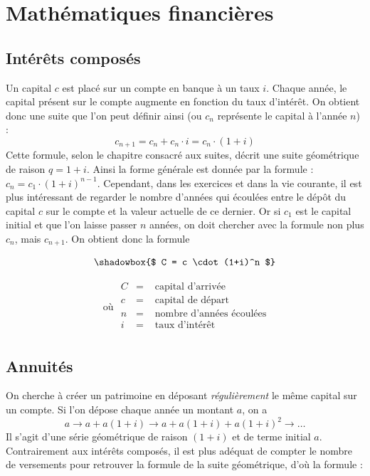 \chapter{Mathématiques financières}

\section{Intérêts composés}

Un capital $c$ est placé sur un compte en banque à un taux $i$. Chaque année, le capital présent sur le compte augmente en fonction du taux d'intérêt. On obtient donc une suite que l'on peut définir ainsi (ou $c_n$ représente le capital à l'année $n$) :
$$
c_{n+1} = c_n + c_n \cdot i = c_n \cdot (1+i)
$$
Cette formule, selon le chapitre consacré aux suites, décrit une suite géométrique~ de raison $q = 1+i$. Ainsi la forme générale est donnée par la formule : $c_n = c_1 \cdot (1+i)^{n-1}$. Cependant, dans les exercices et dans la vie courante, il est plus intéressant de regarder le nombre d'années qui écoulées entre le dépôt du capital $c$ sur le compte et la valeur actuelle de ce dernier. Or si $c_1$ est le capital initial et que l'on laisse passer $n$ années, on doit chercher avec la formule non plus $c_n$, mais $c_{n+1}$. On obtient donc la formule


\begin{equation*}
\shadowbox{$
C = c \cdot (1+i)^n $}
\end{equation*}

\begin{equation*}
\mbox{ où } 
\begin{array}{lll}
C&=&\mbox{ capital d'arrivée}\\
c&=&\mbox{ capital de départ}\\
n&=&\mbox{ nombre d'années écoulées}\\
i&=&\mbox{ taux d'intérêt}\\
\end{array}
\end{equation*}

\section{Annuités}

On cherche à créer un patrimoine en déposant \textit{régulièrement} le même capital sur un compte. Si l'on dépose chaque année un montant $a$, on a 
$$
a \rightarrow a + a (1+i) \rightarrow a + a (1+i) + a(1+i)^2 \rightarrow \dots
$$
Il s'agit d'une série géométrique de raison $(1+i)$ et de terme initial $a$. Contrairement aux intérêts composés, il est plus adéquat de compter le nombre de versements pour retrouver la formule de la suite géométrique, d'où la formule :

